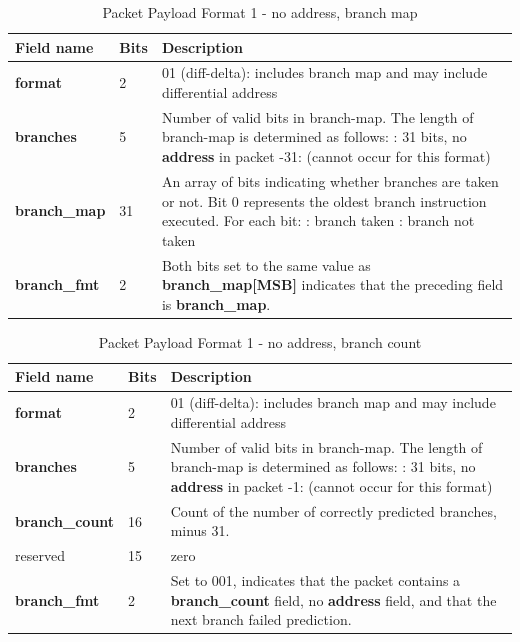 \begin{table}[htp]
  \centering
  \caption{Packet Payload Format 1  - no address, branch map}
  \label{tab:te_inst0-1-noaddr-map}
  \begin{tabulary}{\textwidth}{|l|p{35mm}|p{80mm}|}
    \hline
    {\bf Field name} & {\bf Bits} & {\bf Description} \\
    \hline
    \textbf{format}	& 2	& 01 (diff-delta): includes branch map and may include differential address\\
    \hline
    \textbf{branches} & 5 & Number of valid bits in branch-map. The length of branch-map is determined as follows: :      31 bits, no \textbf{address} in packet -31: 	(cannot occur for this format) \\
    \hline
    \textbf{branch\_map} & 31 & 
                 An array of bits indicating whether branches are taken or not.\newline
    Bit 0 represents the oldest branch instruction executed.   For each bit: : branch taken : branch not taken \\
    \hline
    \textbf{branch\_fmt} & 2  & Both bits set to the same value as \textbf{branch\_map[MSB]} indicates that the
    preceding field is \textbf{branch\_map}. \\
    \hline
  \end{tabulary}
\end{table}

\begin{table}[htp]
  \centering
  \caption{Packet Payload Format 1 - no address, branch count}
  \label{tab:te_inst0-1-noaddr-count}
  \begin{tabulary}{\textwidth}{|l|p{35mm}|p{80mm}|}
    \hline
    {\bf Field name} & {\bf Bits} & {\bf Description} \\
    \hline
    \textbf{format}	& 2	& 01 (diff-delta): includes branch map and may include differential address\\
    \hline
    \textbf{branches} & 5 & Number of valid bits in branch-map. The length of branch-map is determined as follows: :      31 bits, no \textbf{address} in packet -1: 	(cannot occur for this format) \\
    \hline
    \textbf{branch\_count} & 16 & Count of the number of correctly predicted branches, minus 31. \\
    \hline
    reserved & 15 & zero\\
    \hline
    \textbf{branch\_fmt} & 2 & Set to 001, indicates that the packet contains a \textbf{branch\_count} field, no
    \textbf{address} field, and that the next branch failed prediction. \\
    \hline
  \end{tabulary}
\end{table}

